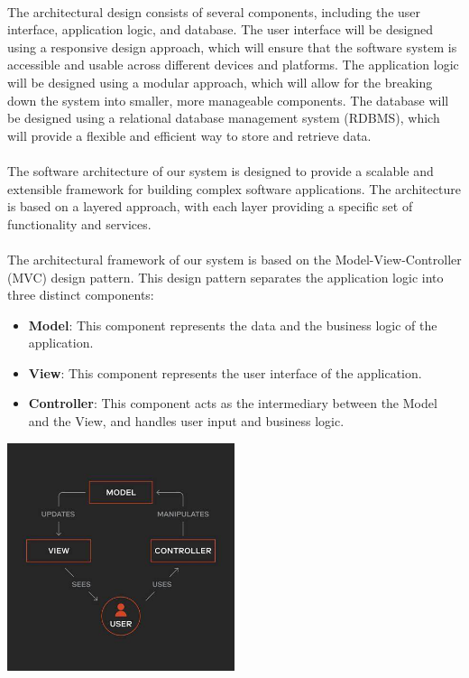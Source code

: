 \documentclass{article}
\begin{document}
\paragraph*{}
The architectural design consists of several components, including the user interface, application logic, and database. The user interface will be designed using a responsive design approach, which will ensure that the software system is accessible and usable across different devices and platforms. The application logic will be designed using a modular approach, which  will allow for the breaking down the system into smaller, more manageable components. The database will be designed using a relational database management system (RDBMS), which will provide a flexible and efficient way to store and retrieve data.

\paragraph*{}
The software architecture of our system is designed to provide a scalable and extensible framework for building complex software applications. The architecture is based on a layered approach, with each layer providing a specific set of functionality and services.

\paragraph*{}
The architectural framework of our system is based on the Model-View-Controller (MVC) design pattern. This design pattern separates the application logic into three distinct components:

\begin{itemize}
\item \textbf{Model}: This component represents the data and the business logic of the application.
\item \textbf{View}: This component represents the user interface of the application.
\item \textbf{Controller}: This component acts as the intermediary between the Model and the View, and handles user input and business logic.
\end{itemize}

\includegraphics[width=0.5\textwidth]{mvc.jpeg}
\end{document}

